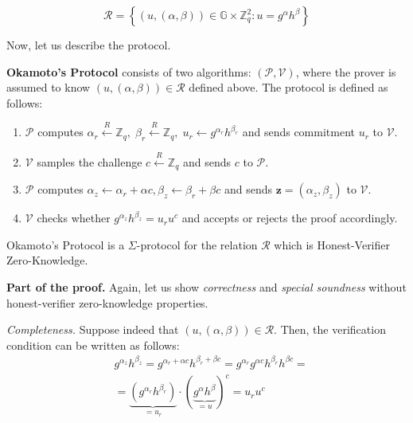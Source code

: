 \documentclass[../lecture-notes-105x135.tex]{subfiles}
\begin{document}
\begin{equation*}
    \mathcal{R} = \left\{ (u,(\alpha,\beta)) \in \mathbb{G} \times \mathbb{Z}_q^2: u = g^{\alpha}h^{\beta} \right\}
\end{equation*}

\vspace{-1mm}

Now, let us describe the protocol.

\vspace{-1mm}

\begin{definition}
    \textbf{Okamoto's Protocol} consists of two algorithms: $(\mathcal{P}, \mathcal{V})$, where the prover is assumed to know $(u,(\alpha,\beta)) \in \mathcal{R}$ defined above. The protocol is defined as follows:
    \begin{enumerate}
        \item $\mathcal{P}$ computes $\alpha_r \xleftarrow{R} \mathbb{Z}_q, \; \beta_r \xleftarrow{R} \mathbb{Z}_q, \; u_r \gets g^{\alpha_r}h^{\beta_r}$ and sends commitment $u_r$ to $\mathcal{V}$.
        \item $\mathcal{V}$ samples the challenge $c \xleftarrow{R} \mathbb{Z}_q$ and sends $c$ to $\mathcal{P}$.
        \item $\mathcal{P}$ computes $\alpha_z \gets \alpha_r + \alpha c, \beta_z \gets \beta_r + \beta c$ and sends $\mathbf{z} = (\alpha_z,\beta_z)$ to $\mathcal{V}$.
        \item $\mathcal{V}$ checks whether $g^{\alpha_z}h^{\beta_z} = u_r u^c$ and accepts or rejects the proof accordingly.
    \end{enumerate}
\end{definition}

\vspace{-4mm}

\begin{theorem}
    Okamoto's Protocol is a $\Sigma$-protocol for the relation $\mathcal{R}$ which is Honest-Verifier Zero-Knowledge.
\end{theorem}

\vspace{-1mm}

\textbf{Part of the proof.} Again, let us show \textit{correctness} and \textit{special soundness} without honest-verifier zero-knowledge properties.

\textit{Completeness.} Suppose indeed that $(u,(\alpha,\beta)) \in \mathcal{R}$. Then, the verification condition can be written as follows:
\begin{equation*}
    \begin{aligned}
        & g^{\alpha_z}h^{\beta_z} = g^{\alpha_r + \alpha c}h^{\beta_r + \beta c} = g^{\alpha_r}g^{\alpha c}h^{\beta_r}h^{\beta c} = \\ 
        & = \underbrace{(g^{\alpha_r}h^{\beta_r})}_{=u_r} \cdot (\underbrace{g^{\alpha}h^{\beta}}_{=u})^c = u_r u^c        
    \end{aligned}
\end{equation*}
\end{document}

